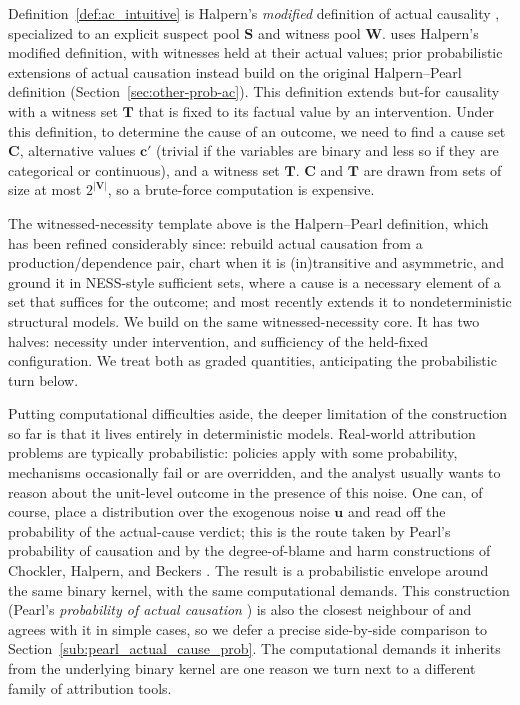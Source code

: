 \noindent Definition~\ref{def:ac_intuitive} is Halpern's \emph{modified} definition of actual
causality \citep{halpern2015modification, actualCausalityHalpern}, specialized to an explicit suspect
pool $\mathbf{S}$ and witness pool $\mathbf{W}$. \ourapproach uses Halpern's modified definition, with witnesses held at their actual values; prior probabilistic extensions of actual causation instead build on the original Halpern--Pearl definition (Section~\ref{sec:other-prob-ac}).
This definition extends but-for causality with a witness set $\mathbf{T}$ that is fixed to its factual value by
an intervention.
Under this definition, to determine the cause of an outcome, we need to find a cause set $\mathbf{C}$, alternative values 
$\mathbf{c}'$ (trivial if the variables are binary and less so if they are categorical or continuous),
and a witness set $\mathbf{T}$.
$\mathbf{C}$ and $\mathbf{T}$ are drawn from sets of size at most $2^{|\mathbf{V}|}$, so a brute-force computation
 is expensive.

\noindent The witnessed-necessity template above is the Halpern--Pearl definition, which has
been refined considerably since: \citet{beckersPrincipled2018} rebuild actual causation from a
production/dependence pair, \citet{beckersTransitivity2017} chart when it is (in)transitive and
asymmetric, and \citet{beckersSufficiency2021,beckersNESS2021} ground it in NESS-style sufficient
sets, where a cause is a necessary element of a set that suffices for the outcome; and
\citet{beckers2025nondeterministic} most recently extends it to nondeterministic
structural models. We build on the
same witnessed-necessity core. It has two halves: necessity under intervention, and
sufficiency of the held-fixed configuration. We treat both as graded quantities,
anticipating the probabilistic turn below.

Putting computational difficulties aside, the deeper limitation of the
construction so far is that it lives entirely in deterministic models.
Real-world attribution problems are typically probabilistic: policies apply
with some probability, mechanisms occasionally fail or are overridden, and the
analyst usually wants to reason about the unit-level outcome in the presence
of this noise.
One can, of course, place a distribution over the exogenous noise $\mathbf{u}$ and read
off the probability of the actual-cause verdict; this is the route taken by Pearl's
probability of causation \citep{causalityPearl} and by the degree-of-blame and harm
constructions of Chockler, Halpern, and Beckers
\citep{chocklerResponsibilityBlameStructuralModel2004, beckersHarm2022,
beckersQuantifyingHarm2023}.
The result is a probabilistic envelope around the same binary kernel, with the same computational demands.
This construction (Pearl's \emph{probability of actual causation}
\citep[Def.~10.3.5]{causalityPearl}) is also the closest neighbour of \ourapproach{}
and agrees with it in simple cases, so we defer a precise side-by-side comparison to
Section~\ref{sub:pearl_actual_cause_prob}. The computational demands it inherits from the
underlying binary kernel are one reason we
turn next to a different family of attribution tools.

